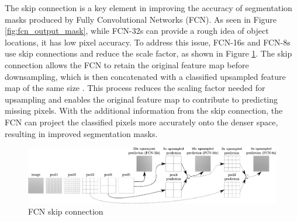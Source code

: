 \begin{figure}[!ht]
    \centering

\end{figure}

The skip connection is a key element in improving the accuracy of segmentation masks produced by Fully Convolutional Networks (FCN). As seen in Figure \ref{fig:fcn_output_mask}, while FCN-32s can provide a rough idea of object locations, it has low pixel accuracy. To address this issue, FCN-16s and FCN-8s use skip connections and reduce the scale factor, as shown in Figure \ref{fig:fcn_skip_conn}. The skip connection allows the FCN to retain the original feature map before downsampling, which is then concatenated with a classified upsampled feature map of the same size \cite{mask_rcnn_2017}. This process reduces the scaling factor needed for upsampling and enables the original feature map to contribute to predicting missing pixels. With the additional information from the skip connection, the FCN can project the classified pixels more accurately onto the denser space, resulting in improved segmentation masks.

\begin{figure}[!ht]
    \centering
    \includegraphics[width=6in]{figures/fcn_skip_conn.png}
    \caption{{\color{red} FCN skip connection}}  \label{fig:fcn_skip_conn}
\end{figure}